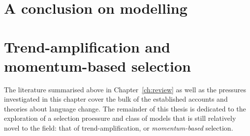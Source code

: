 



\section{A conclusion on modelling}


\section{Trend-amplification and momentum-based selection}

The literature summarised above in Chapter~\ref{ch:review} as well as the pressures investigated in this chapter cover the bulk of the established accounts and theories about language change.
The remainder of this thesis is dedicated to the exploration of a selection proessure and class of models that is still relatively novel to the field: that of trend-amplification, or \emph{momentum-based} selection.

